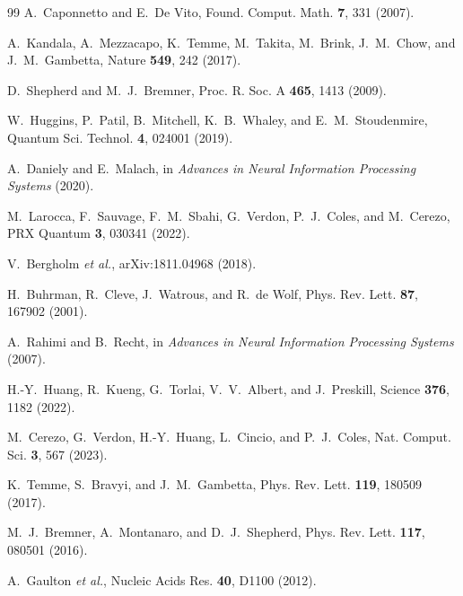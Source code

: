 \documentclass[aps,prb,reprint,superscriptaddress,showpacs]{revtex4-2}
\begin{document}
\begin{thebibliography}{99}
A.~Caponnetto and E.~De Vito, Found. Comput. Math. \textbf{7}, 331 (2007).

A.~Kandala, A.~Mezzacapo, K.~Temme, M.~Takita, M.~Brink, J.~M.~Chow, and J.~M.~Gambetta, Nature \textbf{549}, 242 (2017).

D.~Shepherd and M.~J.~Bremner, Proc. R. Soc. A \textbf{465}, 1413 (2009).

W.~Huggins, P.~Patil, B.~Mitchell, K.~B.~Whaley, and E.~M.~Stoudenmire, Quantum Sci. Technol. \textbf{4}, 024001 (2019).

A.~Daniely and E.~Malach, in \emph{Advances in Neural Information Processing Systems} (2020).

M.~Larocca, F.~Sauvage, F.~M.~Sbahi, G.~Verdon, P.~J.~Coles, and M.~Cerezo, PRX Quantum \textbf{3}, 030341 (2022).

V.~Bergholm \emph{et al.}, arXiv:1811.04968 (2018).

H.~Buhrman, R.~Cleve, J.~Watrous, and R.~de Wolf, Phys. Rev. Lett. \textbf{87}, 167902 (2001).

A.~Rahimi and B.~Recht, in \emph{Advances in Neural Information Processing Systems} (2007).

H.-Y.~Huang, R.~Kueng, G.~Torlai, V.~V.~Albert, and J.~Preskill, Science \textbf{376}, 1182 (2022).

M.~Cerezo, G.~Verdon, H.-Y.~Huang, L.~Cincio, and P.~J.~Coles, Nat. Comput. Sci. \textbf{3}, 567 (2023).

K.~Temme, S.~Bravyi, and J.~M.~Gambetta, Phys. Rev. Lett. \textbf{119}, 180509 (2017).

M.~J.~Bremner, A.~Montanaro, and D.~J.~Shepherd, Phys. Rev. Lett. \textbf{117}, 080501 (2016).

A.~Gaulton \emph{et al.}, Nucleic Acids Res. \textbf{40}, D1100 (2012).

\end{thebibliography}
\end{document}
